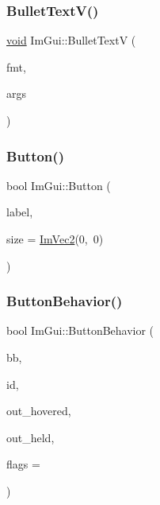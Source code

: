 \mbox{\label{namespaceImGui_af8f4b5e96c745e205974857f9a584583}} 
\subsubsection{\texorpdfstring{Bullet\+Text\+V()}{BulletTextV()}}
{\footnotesize\ttfamily \hyperlink{imgui__impl__opengl3__loader_8h_ac668e7cffd9e2e9cfee428b9b2f34fa7}{void} Im\+Gui\+::\+Bullet\+TextV (\begin{DoxyParamCaption}\item[{const char $\ast$}]{fmt,  }\item[{va\+\_\+list}]{args }\end{DoxyParamCaption})}

\mbox{\label{namespaceImGui_a38094c568ce398db5a3abb9d3ac92030}} 
\subsubsection{\texorpdfstring{Button()}{Button()}}
{\footnotesize\ttfamily bool Im\+Gui\+::\+Button (\begin{DoxyParamCaption}\item[{const char $\ast$}]{label,  }\item[{const \hyperlink{structImVec2}{Im\+Vec2} \&}]{size = {\ttfamily \hyperlink{structImVec2}{Im\+Vec2}(0,~0)} }\end{DoxyParamCaption})}

\mbox{\label{namespaceImGui_a65a4f18b1bc8ce0f351687922089f374}} 
\subsubsection{\texorpdfstring{Button\+Behavior()}{ButtonBehavior()}}
{\footnotesize\ttfamily bool Im\+Gui\+::\+Button\+Behavior (\begin{DoxyParamCaption}\item[{const \hyperlink{structImRect}{Im\+Rect} \&}]{bb,  }\item[{Im\+Gui\+ID}]{id,  }\item[{bool $\ast$}]{out\+\_\+hovered,  }\item[{bool $\ast$}]{out\+\_\+held,  }\item[{Im\+Gui\+Button\+Flags}]{flags = {} }\end{DoxyParamCaption})}

